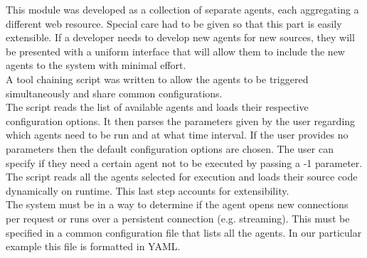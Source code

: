 \documentclass[12pt]{article}
\begin{document}
This module was developed as a collection of separate agents, each aggregating a different web resource. Special care had to be given so that this part is easily extensible. If a developer needs to develop new agents for new sources, they will be presented with a uniform interface that will allow them to include the new agents to the system with minimal effort. 
\hfill \break \\
A tool chaining script was written to allow the agents to be triggered simultaneously and share common configurations. 
\hfill \break \\
The script reads the list of available agents and loads their respective configuration options. It then parses the parameters given by the user regarding which agents need to be run and at what time interval. If the user provides no parameters then the default configuration options are chosen. The user can specify if they need a certain agent not to be executed by passing a -1 parameter. The script reads all the agents selected for execution and loads their source code dynamically on runtime. This last step accounts for extensibility. 
\hfill \break \\
The system must be in a way to determine if the agent opens new connections per request or runs over a persistent connection (e.g. streaming). This must be specified in a common configuration file that lists all the agents. In our particular example this file is formatted in YAML. 
\end{document}
